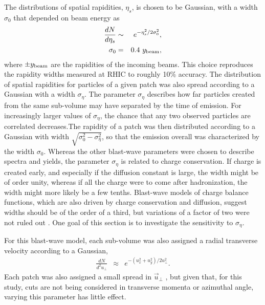 The distributions of spatial rapidities, $\eta_s$, is chosen to be Gaussian, with a width $\sigma_0$ that depended on beam energy as
\begin{eqnarray}
\frac{dN}{d\eta_s}&\sim& e^{-\eta_s^2/2\sigma_0^2},\\
\nonumber
\sigma_0&=&0.4~y_{\rm beam},
\end{eqnarray}
where $\pm y_{\rm beam}$ are the rapidities of the incoming beams. This choice reproduces the rapidity widths measured at RHIC to roughly 10\% accuracy. The distribution of spatial rapidities for particles of a given patch was also spread according to a Gaussian with a width $\sigma_\eta$. The parameter $\sigma_\eta$ describes how far particles created from the same sub-volume may have separated by the time of emission. For increasingly larger values of $\sigma_\eta$, the chance that any two observed particles are correlated decreases.The rapidity of a patch was then distributed according to a Gaussian with width $\sqrt{\sigma_0^2-\sigma_\eta^2}$, so that the emission overall was characterized by the width $\sigma_0$. Whereas the other blast-wave parameters were chosen to describe spectra and yields, the parameter $\sigma_\eta$ is related to charge conservation. If charge is created early, and especially if the diffusion constant is large, the width might be of order unity, whereas if all the charge were to come after hadronization, the width might more likely be a few tenths. Blast-wave models of charge balance functions, which are also driven by charge conservation and diffusion, suggest widths should be of the order of a third, but variations of a factor of two were not ruled out \cite{Schlichting:2010qia}. One goal of this section is to investigate the sensitivity to $\sigma_\eta$.

For this blast-wave model, each sub-volume was also assigned a radial transverse velocity according to a Gaussian,
\begin{eqnarray}
\frac{dN}{d^2u_\perp}&\approx&e^{-(u_x^2+u_y^2)/2u_\perp^2}.
\end{eqnarray}
Each patch was also assigned a small spread in $\vec{u}_\perp$ , but given that, for this study, cuts are not being considered in transverse momenta or azimuthal angle, varying this parameter has little effect. 

